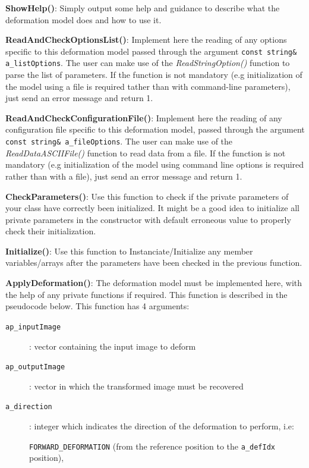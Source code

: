 \documentclass[a4paper, 11pt]{article}
\begin{document}
\begin{description}
\item \textbf{ShowHelp()}: Simply output some help and guidance to describe what the deformation model does and how to use it.
\item \textbf{ReadAndCheckOptionsList()}: Implement here the reading of any options specific to this deformation model passed through the argument \texttt{const string\& a\_listOptions}. The user can make use of the \textit{ReadStringOption()} function to parse the list of parameters. If the function is not mandatory (e.g initialization of the model using a file is required tather than with command-line parameters), just send an error message and return 1.
\item \textbf{ReadAndCheckConfigurationFile()}: Implement here the reading of any configuration file specific to this deformation model, passed through the argument \texttt{const string\& a\_fileOptions}. The user can make use of the \textit{ReadDataASCIIFile()} function to read data from a file. If the function is not mandatory (e.g initialization of the model using command line options is required rather than with a file), just send an error message and return 1.
\item \textbf{CheckParameters()}: Use this function to check if the private parameters of your class have correctly been initialized. It might be a good idea to initialize all private parameters in the constructor with default erroneous value to properly check their initialization.
\item \textbf{Initialize()}: Use this function to Instanciate/Initialize any member variables/arrays after the parameters have been checked in the previous function.  
\item \textbf{ApplyDeformation()}: The deformation model must be implemented here, with the help of any private functions if required. This function is described in the pseudocode below. This function has 4 arguments:
\begin{description}
\item[\texttt{ap\_inputImage}]: vector containing the input image to deform
\item[\texttt{ap\_outputImage}]: vector in which the transformed image must be recovered
\item[\texttt{a\_direction}]:  integer which indicates the direction of the deformation to perform, i.e: 

\texttt{FORWARD\_DEFORMATION} (from the reference position to the \texttt{a\_defIdx} position), 


\end{description}
\end{description}
\end{document}
